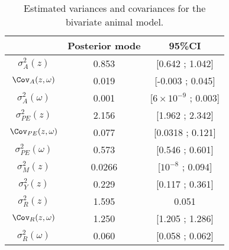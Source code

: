 \begin{table}[H] 
\centering
\caption{Estimated variances and covariances for the bivariate animal model.}
\label{table:BivariateAM}
\begin{tabular}{c c c}
\hline
 & Posterior mode & 95\%CI\\
 \hline
 $\sigma_{A}^2(z)$ & 0.853 & [0.642 ; 1.042]\\
$\Cov_{A}(z,\omega)$ & 0.019 & [-0.003 ; 0.045] \\
$\sigma_{A}^2(\omega)$ & 0.001 & [$6\times 10^{-9}$ ; 0.003]\\
$\sigma_{PE}^2(z)$ & 2.156 & [1.962 ; 2.342]\\
$\Cov_{PE}(z,\omega)$ & 0.077 &  [0.0318 ; 0.121]\\
$\sigma_{PE}^2(\omega)$ & 0.573 & [0.546 ; 0.601]\\
$\sigma_{M}^2(z)$ & 0.0266 & [$10^{-8}$ ; 0.094] \\
$\sigma_{Y}^2(z)$ & 0.229 & [0.117 ; 0.361] \\
$\sigma_{R}^2(z)$ & 1.595 & 0.051\\
$\Cov_{R}(z,\omega)$ & 1.250 & [1.205 ; 1.286]\\
$\sigma_{R}^2(\omega)$ & 0.060 &  [0.058 ; 0.062]\\
\hline
\end{tabular}
\end{table}